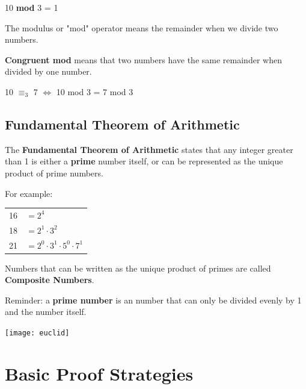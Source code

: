 \documentclass{article}
\begin{document}
\centerline{10 \textbf{mod} 3 = 1}
\noindent

The modulus or "mod" operator means the remainder when we divide two numbers.

\textbf{Congruent mod} means that two numbers have the same remainder when divided by one number.

\centerline{10 $\equiv_3$ 7 $\Leftrightarrow$ 10 mod 3 = 7 mod 3}

\subsection{Fundamental Theorem of Arithmetic}

\begin{minipage}{0.65\textwidth}
The \textbf{Fundamental Theorem of Arithmetic} states that any integer greater than 1 is either a \textbf{prime} number itself, or can be represented as the unique product of prime numbers.

For example:

\begin{center}

\begin{tabular}{cl}
16 & $= 2^4$\\
18 & $= 2^1 \cdot 3^2$\\
21 & $= 2^0 \cdot 3^1 \cdot 5^0 \cdot 7^1$
\end{tabular}
\end{center}

Numbers that can be written as the unique product of primes are called \textbf{Composite Numbers}.

\scriptsize{Reminder: a \textbf{prime number} is an number that can only be divided evenly by 1 and the number itself. }
\end{minipage}
\hspace{0.3cm}
\begin{minipage}{0.35\textwidth}
\texttt{[image: euclid]}
\end{minipage}

\pagebreak

\text{}

\section{Basic Proof Strategies}
\end{document}
